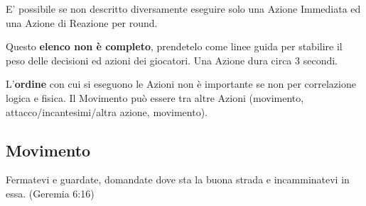 \documentclass[12pt,a4paper,twoside,openany]{book}
\begin{document}
\begin{multicols}{2}
E' possibile se non descritto diversamente eseguire solo una Azione Immediata ed una Azione di Reazione per round.

\medskip

Questo \textbf{elenco non è completo}, prendetelo come linee guida per stabilire il peso delle decisioni ed azioni dei giocatori. Una Azione dura circa 3 secondi.

L'\textbf{ordine} con cui si eseguono le Azioni non è importante se non per correlazione logica e fisica. Il Movimento può essere tra altre Azioni (movimento, attacco/incantesimi/altra azione, movimento).


\end{multicols}

\subsection{Movimento}\label{movimento}


\begin{changemargin}{0.3cm}{0.3cm}\begin{enfasi}{Fermatevi e guardate, domandate dove sta la buona strada e incamminatevi in essa. (Geremia 6:16)}
\end{enfasi}\end{changemargin}
\end{document}
